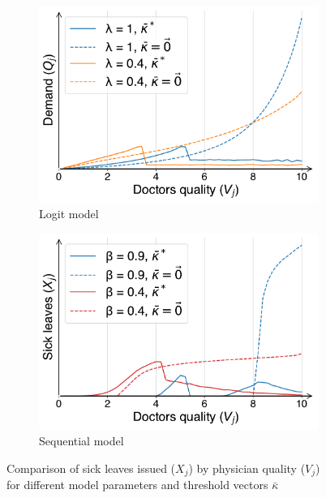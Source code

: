 \documentclass[../main.tex]{subfiles}
\begin{document}
\vspace{-0.25cm}

\begin{figure}[H]
    \centering
    \begin{subfigure}[b]{0.46\linewidth}
        \centering
        \includegraphics[width=\linewidth]{X_comparison.pdf}
        \vspace{-0.6cm}
        \caption{Logit model}
        \label{fig:logit_X_comp}
    \end{subfigure}
    \hspace{0.05\linewidth}  %
    \begin{subfigure}[b]{0.46\linewidth}
        \centering
        \includegraphics[width=\linewidth]{schnell_X_comparison.pdf}
        \vspace{-0.6cm}
        \caption{Sequential model}
        \label{fig:schnell_X_comp}
    \end{subfigure}
    \caption{Comparison of sick leaves issued ($X_j$) by physician quality ($V_j$)\\ for different model parameters and threshold vectors $\bar{\kappa}$}
    \label{fig:X_comparison}
\end{figure}
\end{document}
